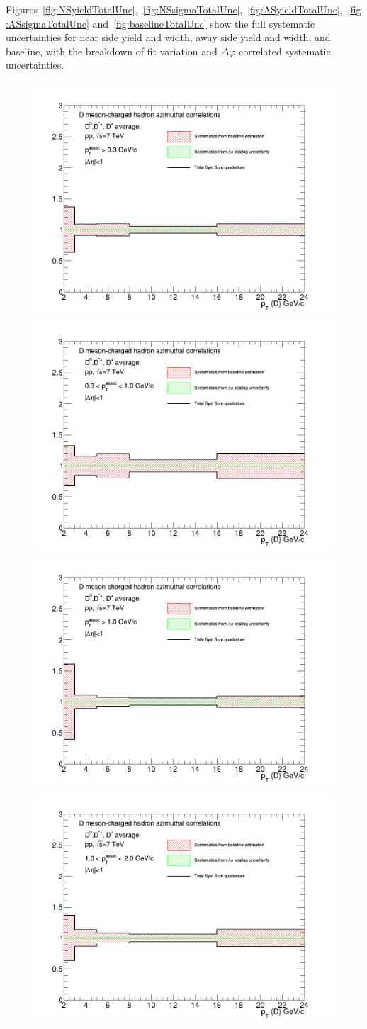 \clearpage

Figures~\ref{fig:NSyieldTotalUnc},~\ref{fig:NSsigmaTotalUnc},~\ref{fig:ASyieldTotalUnc},~\ref{fig:ASsigmaTotalUnc} and~\ref{fig:baselineTotalUnc} show the full systematic uncertainties for near side yield and width, away side yield and width, and baseline, with the breakdown of fit variation and $\Delta\varphi$ correlated systematic uncertainties.

\begin{figure}[!htbp]
\centering
{\includegraphics[width=0.48\linewidth, height=0.33\linewidth]{figures/FitOutput/TotalSystematicSourcesNSYield_pthad03to99.png}}
{\includegraphics[width=0.48\linewidth, height=0.33\linewidth]{figures/FitOutput/TotalSystematicSourcesNSYield_pthad03to1.png}}
{\includegraphics[width=0.48\linewidth, height=0.33\linewidth]{figures/FitOutput/TotalSystematicSourcesNSYield_pthad1to99.png}}
{\includegraphics[width=0.48\linewidth, height=0.33\linewidth]{figures/FitOutput/TotalSystematicSourcesNSYield_pthad1to2.png}}

\end{figure}
